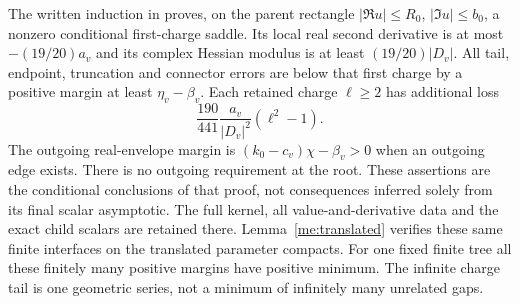 The written induction in \cite[Sections 7.3--7.5]{CircleTree} proves,
on the parent rectangle $|\Re u|\le R_0$, $|\Im u|\le b_0$,
a nonzero conditional first-charge saddle. Its local real second
derivative is at most $-(19/20)a_v$ and its complex Hessian modulus
is at least $(19/20)|D_v|$. All tail, endpoint, truncation and
connector errors are below that first charge by a positive margin
at least $\eta_v-\beta_v$. Each retained charge $\ell\ge2$ has
additional loss
\begin{equation}\label{me:directed-charge-loss}
 \frac{190}{441}\frac{a_v}{|D_v|^2}(\ell^2-1).
\end{equation}
The outgoing real-envelope margin is
$(k_0-c_v)\chi-\beta_v>0$ when an outgoing edge exists. There is
no outgoing requirement at the root. These assertions are the
conditional conclusions of that proof, not consequences inferred
solely from its final scalar asymptotic. The full kernel, all
value-and-derivative data and the exact child scalars are retained there.
Lemma~\ref{me:translated} verifies these same finite interfaces
on the translated parameter compacts. For one fixed finite tree
all these finitely many positive margins have positive minimum.
The infinite charge tail is one geometric series, not a minimum
of infinitely many unrelated gaps.

